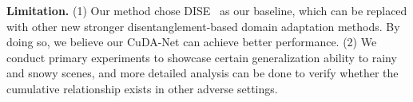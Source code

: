 \documentclass[10pt,twocolumn,letterpaper]{article}
\newcommand{\heading}[1]{\noindent\textbf{#1}}
\begin{document}
\heading{Limitation.}
(1) Our method chose DISE~\cite{chang2019all} as our baseline, which can be replaced with other new stronger disentanglement-based domain adaptation methods. By doing so, we believe our CuDA-Net can achieve better performance.
(2) We conduct primary experiments to showcase certain generalization ability to rainy and snowy scenes, and more detailed analysis can be done to verify whether the cumulative relationship exists in other adverse settings.






{\small


}
\end{document}
